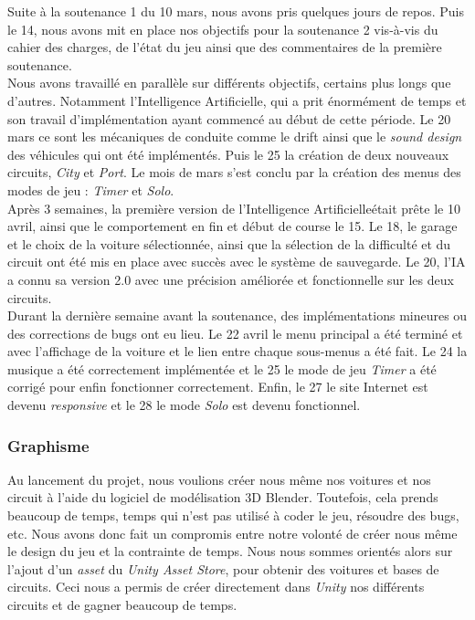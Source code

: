 \documentclass[a4paper,12pt]{article}
\newcommand{\AI}{Intelligence Artificielle}
\begin{document}
            Suite à la soutenance 1 du 10 mars, nous avons pris quelques jours de repos. Puis le 14, nous
            avons mit en place nos objectifs pour la soutenance 2 vis-à-vis du cahier des charges, de
            l'état du jeu ainsi que des commentaires de la première soutenance.\\
            Nous avons travaillé en parallèle sur différents objectifs, certains plus longs que d'autres.
            Notamment l'\AI, qui a prit énormément de temps et son travail d'implémentation ayant
            commencé au début de cette période. Le 20 mars ce sont les mécaniques de conduite comme le
            drift ainsi que le \textit{sound design} des véhicules qui ont été implémentés. Puis le 25 la
            création de deux nouveaux circuits, \textsl{City} et \textsl{Port}. Le mois de mars s'est
            conclu par la création des menus des modes de jeu : \textsl{Timer} et \textsl{Solo}.\\
            Après 3 semaines, la première version de l'\AI était prête le 10 avril, ainsi que le
            comportement en fin et début de course le 15. Le 18, le garage et le choix de la voiture 
            sélectionnée, ainsi que la sélection de la difficulté et du circuit ont été mis en place avec
            succès avec le système de sauvegarde. Le 20, l'IA a connu sa version 2.0 avec une précision améliorée et fonctionnelle sur
            les deux circuits.\\
            Durant la dernière semaine avant la soutenance, des implémentations mineures ou des
            corrections de bugs ont eu lieu. Le 22 avril le menu principal a été terminé et avec
            l'affichage de la voiture et le lien entre chaque sous-menus a été fait. Le 24 la musique a
            été correctement implémentée et le 25 le mode de jeu \textsl{Timer} a été corrigé pour enfin
            fonctionner correctement. Enfin, le 27 le site Internet est devenu \textit{responsive} et le
            28 le mode \textsl{Solo} est devenu fonctionnel.

            \subsubsection{Graphisme}
                Au lancement du projet, nous voulions créer nous même nos voitures et nos circuit à 
                l'aide du logiciel de modélisation 3D Blender. Toutefois, cela prends beaucoup de temps,
                temps qui n'est pas utilisé à coder le jeu, résoudre des bugs, etc. Nous avons donc fait
                un compromis entre notre volonté de créer nous même le design du jeu et la contrainte de
                temps. Nous nous sommes orientés alors sur l'ajout d'un \textit{asset} du \textsl{Unity
                Asset Store}, pour obtenir des voitures et bases de circuits. Ceci nous a permis de
                créer directement dans \textsl{Unity} nos différents circuits et de gagner beaucoup de 
                temps. 
            
\end{document}
